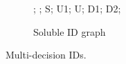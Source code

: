 \begin{figure}
\begin{subfigure}{0.32\textwidth}
\begin{influence-diagram}
      ;
      ;
       {S};
       {U1};
       {U};
       {D1};
       {D2};
     
    \end{influence-diagram}
    \caption{Soluble ID graph}
    \label{fig:sufficient-recall}
  \end{subfigure}
  \caption{Multi-decision IDs.}
  \label{fig:multi-decision}
\end{figure}

